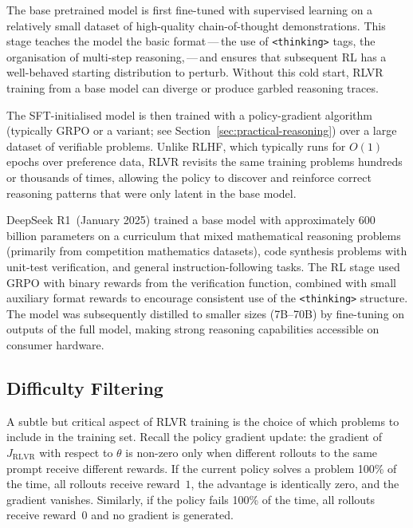 \begin{description}[leftmargin=!,labelwidth=3.5cm]
\item[Stage~1: SFT cold start] The base pretrained model is first
  fine-tuned with supervised learning on a relatively small dataset of
  high-quality chain-of-thought demonstrations. This stage teaches the
  model the basic format\,---\,the use of \texttt{<thinking>} tags,
  the organisation of multi-step reasoning,\,---\,and ensures that
  subsequent RL has a well-behaved starting distribution to perturb.
  Without this cold start, RLVR training from a base model can diverge
  or produce garbled reasoning traces.

\item[Stage~2: Large-scale RLVR] The SFT-initialised model is then
  trained with a policy-gradient algorithm (typically GRPO or a
  variant; see Section~\ref{sec:practical-reasoning}) over a large
  dataset of verifiable problems. Unlike RLHF, which typically runs
  for $O(1)$ epochs over preference data, RLVR revisits the same
  training problems hundreds or thousands of times, allowing the
  policy to discover and reinforce correct reasoning patterns that were
  only latent in the base model.
\end{description}

\begin{example}
\label{ex:deepseek-r1}
DeepSeek R1~(January 2025) trained a base model with approximately
600 billion parameters on a curriculum that mixed mathematical
reasoning problems (primarily from competition mathematics datasets),
code synthesis problems with unit-test verification, and general
instruction-following tasks. The RL stage used GRPO with binary
rewards from the verification function, combined with small auxiliary
format rewards to encourage consistent use of the \texttt{<thinking>}
structure. The model was subsequently distilled to smaller sizes
(7B--70B) by fine-tuning on outputs of the full model, making
strong reasoning capabilities accessible on consumer hardware.
\end{example}

\subsection{Difficulty Filtering}
\label{subsec:difficulty-filtering}

A subtle but critical aspect of RLVR training is the choice of which
problems to include in the training set. Recall the policy gradient
update: the gradient of $J_{\mathrm{RLVR}}$ with respect to $\theta$
is non-zero only when different rollouts to the same prompt receive
different rewards. If the current policy solves a problem 100\% of the
time, all rollouts receive reward~$1$, the advantage is identically
zero, and the gradient vanishes. Similarly, if the policy fails 100\%
of the time, all rollouts receive reward~$0$ and no gradient is
generated.

